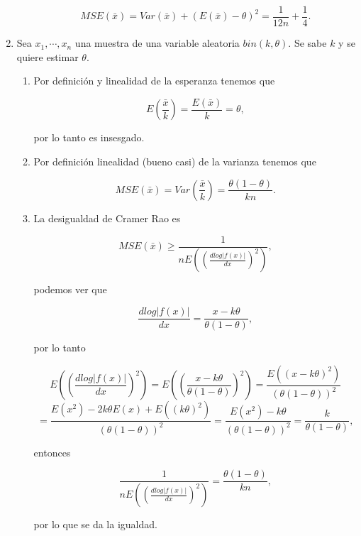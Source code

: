\documentclass[letterpaper]{article}
\theoremstyle{definition}
\theoremstyle{lemathm}
\theoremstyle{lemademthm}
\begin{document}
\begin{enumerate}
\begin{enumerate}
			\[MSE(\bar{x}) = Var(\bar{x}) + (E(\bar{x}) - \theta)^2 = \frac{1}{12n} + \frac{1}{4}.\]
		\end{enumerate}

		\item Sea $x_1,\cdots,x_n$ una muestra de una variable aleatoria $bin(k,\theta)$. Se sabe $k$ y se quiere estimar $\theta$.
		
		\begin{enumerate}
			\item Por definición y linealidad de la esperanza tenemos que
			
			\[E(\frac{\bar{x}}{k}) = \frac{E(\bar{x})}{k} = \theta,\]

			por lo tanto es insesgado.

			\item Por definición linealidad (bueno casi) de la varianza tenemos que
			
			\[MSE(\bar{x}) = Var(\frac{\bar{x}}{k}) = \frac{\theta(1-\theta)}{kn}.\]

			\item La desigualdad de Cramer Rao es
			
			\[MSE(\bar{x}) \geq \frac{1}{nE((\frac{d log|f(x)|}{dx})^2)},\]

			podemos ver que

			\[\frac{d log|f(x)|}{dx} = \frac{x-k\theta}{\theta(1-\theta)},\]

			por lo tanto

			\[E((\frac{d log|f(x)|}{dx})^2) = E((\frac{x-k\theta}{\theta(1-\theta)})^2) = \frac{E((x-k\theta)^2)}{(\theta(1-\theta))^2}\]\[= \frac{E(x^2) -2k\theta E(x) + E((k\theta)^2)}{(\theta(1-\theta))^2} = \frac{E(x^2) -k\theta}{(\theta(1-\theta))^2} = \frac{k}{\theta(1-\theta)},\]

			entonces

			\[\frac{1}{nE((\frac{d log|f(x)|}{dx})^2)} = \frac{\theta(1-\theta)}{kn},\]

			por lo que se da la igualdad.

		\end{enumerate}
		
    \end{enumerate}

	
\end{document}
